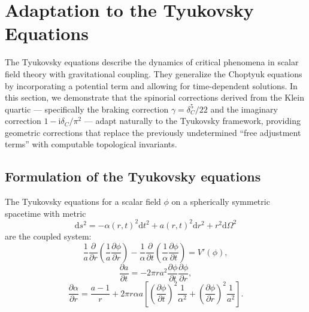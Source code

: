 \documentclass[12pt,a4paper]{article}
\theoremstyle{definition}
\theoremstyle{remark}
\newcommand{\dd}{\mathrm{d}}
\newcommand{\ii}{\mathrm{i}}
\begin{document}
\section{Adaptation to the Tyukovsky Equations}
\label{sec:tyukovsky}

The Tyukovsky equations describe the dynamics of critical phenomena in scalar field theory with gravitational coupling. They generalize the Choptyuk equations by incorporating a potential term and allowing for time-dependent solutions. In this section, we demonstrate that the spinorial corrections derived from the Klein quartic --- specifically the braking correction $\gamma = \delta_C^5/22$ and the imaginary correction $1 - \ii\delta_C/\pi^2$ --- adapt naturally to the Tyukovsky framework, providing geometric corrections that replace the previously undetermined ``free adjustment terms'' with computable topological invariants.

\subsection{Formulation of the Tyukovsky equations}

The Tyukovsky equations for a scalar field $\phi$ on a spherically symmetric spacetime with metric
\begin{equation}
\dd s^2 = -\alpha(r, t)^2 \dd t^2 + a(r, t)^2 \dd r^2 + r^2 \dd\Omega^2
\end{equation}
are the coupled system:
\begin{equation}
\label{eq:tyukovsky-1}
\frac{1}{a} \frac{\partial}{\partial r}\left(\frac{1}{a} \frac{\partial \phi}{\partial r}\right) - \frac{1}{\alpha} \frac{\partial}{\partial t}\left(\frac{1}{\alpha} \frac{\partial \phi}{\partial t}\right) = V'(\phi),
\end{equation}
\begin{equation}
\label{eq:tyukovsky-2}
\frac{\partial a}{\partial t} = -2\pi r a^2 \frac{\partial\phi}{\partial t} \frac{\partial\phi}{\partial r},
\end{equation}
\begin{equation}
\label{eq:tyukovsky-3}
\frac{\partial \alpha}{\partial r} = \frac{a - 1}{r} + 2\pi r \alpha a \left[\left(\frac{\partial\phi}{\partial t}\right)^2 \frac{1}{\alpha^2} + \left(\frac{\partial\phi}{\partial r}\right)^2 \frac{1}{a^2}\right].
\end{equation}
\end{document}
